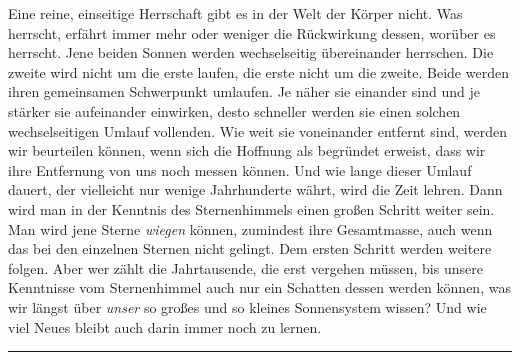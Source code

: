 Eine reine, einseitige Herrschaft gibt es in der Welt der Körper nicht. Was herrscht, erfährt immer mehr oder weniger die Rückwirkung dessen, worüber es herrscht. Jene beiden Sonnen werden wechselseitig übereinander herrschen. Die zweite wird nicht um die erste laufen, die erste nicht um die zweite. Beide werden ihren gemeinsamen Schwerpunkt umlaufen. Je näher sie einander sind und je stärker sie aufeinander einwirken, desto schneller werden sie einen solchen wechselseitigen Umlauf vollenden. Wie weit sie voneinander entfernt sind, werden wir beurteilen können, wenn sich die Hoffnung als begründet erweist, dass wir ihre Entfernung von uns noch messen können. Und wie lange dieser Umlauf dauert, der vielleicht nur wenige Jahrhunderte währt, wird die Zeit lehren. Dann wird man in der Kenntnis des Sternenhimmels einen großen Schritt weiter sein. Man wird jene Sterne \emph{wiegen} können, zumindest ihre Gesamtmasse, auch wenn das bei den einzelnen Sternen nicht gelingt. Dem ersten Schritt werden weitere folgen. Aber wer zählt die Jahrtausende, die erst vergehen müssen, bis unsere Kenntnisse vom Sternenhimmel auch nur ein Schatten dessen werden können, was wir längst über \emph{unser} so großes und so kleines Sonnensystem wissen? Und wie viel Neues bleibt auch darin immer noch zu lernen.
\begin{center}\rule{0.24\linewidth}{0.4pt}\end{center}
